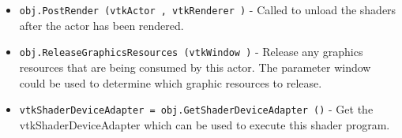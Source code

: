 \begin{itemize}
\item  \verb|obj.PostRender (vtkActor , vtkRenderer )| -  Called to unload the shaders after the actor has been rendered.

\item  \verb|obj.ReleaseGraphicsResources (vtkWindow )| -  Release any graphics resources that are being consumed by this actor.
 The parameter window could be used to determine which graphic
 resources to release.

\item  \verb|vtkShaderDeviceAdapter = obj.GetShaderDeviceAdapter ()| -  Get the vtkShaderDeviceAdapter which can be used to execute this
 shader program.

\end{itemize}

